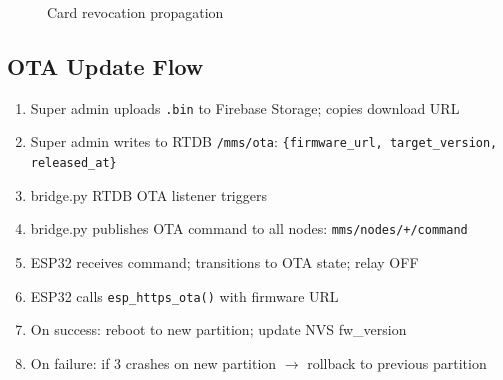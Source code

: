 \begin{figure}[H]
\centering
{}
\caption{Card revocation propagation}
\label{fig:revocation_flow}
\end{figure}

\subsection{OTA Update Flow}

\begin{enumerate}[leftmargin=1.5em]
    \item Super admin uploads \texttt{.bin} to Firebase Storage; copies download URL
    \item Super admin writes to RTDB \texttt{/mms/ota}: \texttt{\{firmware\_url, target\_version, released\_at\}}
    \item bridge.py RTDB OTA listener triggers
    \item bridge.py publishes OTA command to all nodes: \texttt{mms/nodes/+/command}
    \item ESP32 receives command; transitions to OTA state; relay OFF
    \item ESP32 calls \texttt{esp\_https\_ota()} with firmware URL
    \item On success: reboot to new partition; update NVS fw\_version
    \item On failure: if 3 crashes on new partition $\rightarrow$ rollback to previous partition
\end{enumerate}

